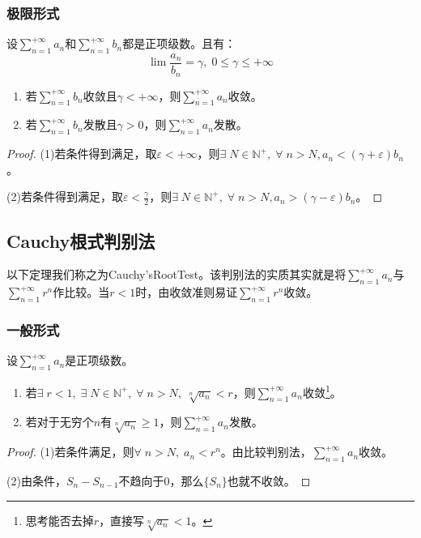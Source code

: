 \subsubsection{极限形式}
\begin{theorem}
	设$\sum\limits_{n=1}^{+\infty}a_n$和$\sum\limits_{n=1}^{+\infty}b_n$都是正项级数。且有：
	\begin{equation*}
		\lim\frac{a_n}{b_n}=\gamma,\;0\leqslant\gamma\leqslant+\infty
	\end{equation*}
	\begin{enumerate}
		\item 若$\sum\limits_{n=1}^{+\infty}b_n$收敛且$\gamma<+\infty$，则$\sum\limits_{n=1}^{+\infty}a_n$收敛。
		\item 若$\sum\limits_{n=1}^{+\infty}b_n$发散且$\gamma>0$，则$\sum\limits_{n=1}^{+\infty}a_n$发散。
	\end{enumerate}
\end{theorem}
\begin{proof}
	(1)若条件得到满足，取$\varepsilon<+\infty$，则$\exists\;N\in\mathbb{N}^+,\;\forall\;n>N,a_n<(\gamma+\varepsilon)b_n$。\par
	(2)若条件得到满足，取$\varepsilon<\frac{\gamma}{2}$，则$\exists\;N\in\mathbb{N}^+,\;\forall\;n>N,a_n>(\gamma-\varepsilon)b_n$。
\end{proof}

\subsection{Cauchy根式判别法}
以下定理我们称之为Cauchy's\gls{RootTest}。该判别法的实质其实就是将$\sum\limits_{n=1}^{+\infty}a_n$与$\sum\limits_{n=1}^{+\infty}r^n$作比较。当$r<1$时，由收敛准则易证$\sum\limits_{n=1}^{+\infty}r^n$收敛。
\subsubsection{一般形式}
\begin{theorem}
	设$\sum\limits_{n=1}^{+\infty}a_n$是正项级数。
	\begin{enumerate}
		\item 若$\exists\;r<1,\;\exists\;N\in\mathbb{N}^+,\;\forall\;n>N,\;\sqrt[n]{a_n}<r$，则$\sum\limits_{n=1}^{+\infty}a_n$收敛\footnote{思考能否去掉$r$，直接写$\sqrt[n]{a_n}<1$。}。
		\item 若对于无穷个$n$有$\sqrt[n]{a_n}\geqslant1$，则$\sum\limits_{n=1}^{+\infty}a_n$发散。
	\end{enumerate}
\end{theorem}
\begin{proof}
	(1)若条件满足，则$\forall\;n>N,\;a_n<r^n$。由比较判别法，$\sum\limits_{n=1}^{+\infty}a_n$收敛。\par
	(2)由条件，$S_n-S_{n-1}$不趋向于$0$，那么$\{S_n\}$也就不收敛。
\end{proof}

